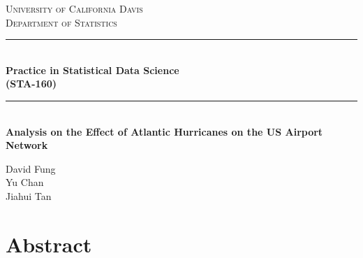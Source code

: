 \documentclass[12pt]{article}
\begin{document}
\begin{titlepage}

\newcommand{\HRule}{\rule{\linewidth}{0.5mm}} %

\center %
 

\textsc{\LARGE University of California Davis }\\[0.3cm] 
\textsc{\Large Department of Statistics}\\[0.5cm] 


\HRule \\[0.4cm]
{ \huge \bfseries Practice in Statistical Data Science\\  (STA-160)}\\[0.03cm]
\HRule \\[1.5cm]

\hfill \break \hfill \break \hfill \break
{ \huge \bfseries Analysis on the Effect of Atlantic Hurricanes on the US Airport Network}\\
\hfill \break \hfill \break \hfill \break
\hfill \break

{\large David Fung \\ Yu Chan\\ Jiahui Tan}\\
 

\vfill %

\end{titlepage}

\newpage
\tableofcontents
\newpage
\section{Abstract} \label{sec:Abstract}
\end{document}
